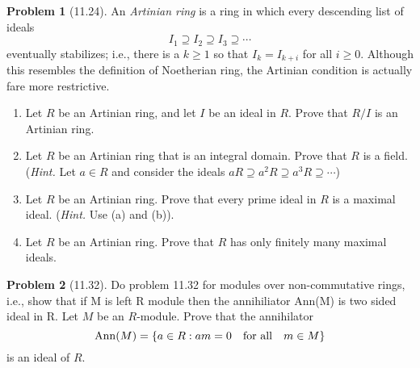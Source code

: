 \documentclass[12pt]{article}
\theoremstyle{definition}
\newtheorem{problem}{Problem}
\DeclareMathOperator{\Ann}{Ann}
\begin{document}
\begin{problem}[11.24]
    An \textit{Artinian ring} is a ring in which every descending list of ideals
    \[
        I_1 \supseteq I_2 \supseteq I_3 \supseteq \cdots
    \]
    eventually stabilizes; i.e., there is a $k \geq 1$ so that $I_k = I_{k + i}$ for all $i \geq 0$. Although this resembles
    the definition of Noetherian ring, the Artinian condition is actually fare more restrictive.

    \begin{enumerate}[label=(\alph*)]
        \item Let $R$ be an Artinian ring, and let $I$ be an ideal in $R$. Prove that $R/I$ is an Artinian ring.
        \begin{solution}

        \end{solution}

        \item Let $R$ be an Artinian ring that is an integral domain. Prove that $R$ is a field. (\textit{Hint.} Let $a \in R$
        and consider the ideals $aR \supseteq a^2R \supseteq a^3R \supseteq \cdots$)
        \begin{solution}

        \end{solution}

        \item Let $R$ be an Artinian ring. Prove that every prime ideal in $R$ is a maximal ideal. (\textit{Hint.} Use (a)
        and (b)).
        \begin{solution}

        \end{solution}

        \item Let $R$ be an Artinian ring. Prove that $R$ has only finitely many maximal ideals.
        \begin{solution}

        \end{solution}
    \end{enumerate}
\end{problem}

\begin{problem}[11.32] Do problem 11.32 for modules over non-commutative rings, i.e., show that 
    if M is left R module then the annihiliator Ann(M) is two sided ideal in R. Let $M$ be an 
    $R$-module. Prove that the annihilator
    \[
        \Ann(M) = \{ a \in R : am = 0 \hspace{10px} \text{for all} \hspace{10px} m \in M \}
    \]
    is an ideal of $R$.
    \begin{solution}

    \end{solution}
\end{problem}
\end{document}
